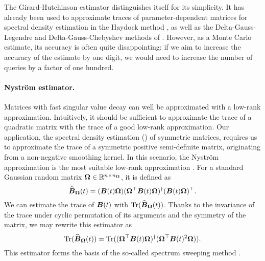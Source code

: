 The Girard-Hutchinson estimator distinguishes itself for its simplicity. It has already been used to approximate traces of parameter-dependent matrices for spectral density estimation in the Haydock method \cite{haydock-1972-electronic-structure}, as well as the Delta-Gauss-Legendre and Delta-Gauss-Chebyshev methods of \cite{lin-2016-approximating-spectral, lin-2017-randomized-estimation}. However, as a Monte Carlo estimate, its accuracy is often quite disappointing: if we aim to increase the accuracy of the estimate by one digit, we would need to increase the number of queries by a factor of one hundred.

\paragraph{Nyström estimator.} Matrices with fast singular value decay can well be approximated with a low-rank approximation. Intuitively, it should be sufficient to approximate the trace of a quadratic matrix with the trace of a good low-rank approximation. Our application, the spectral density estimation () of symmetric matrices, requires us to approximate the trace of a symmetric positive semi-definite matrix, originating from a non-negative smoothing kernel. In this scenario, the Nyström approximation is the most suitable low-rank approximation \cite{gittens-2013-revisiting-nystrom}. For a standard Gaussian random matrix $\boldsymbol{\Omega} \in \mathbb{R}^{n \times n_{\boldsymbol{\Omega}}}$, it is defined as
\begin{equation}
    \widehat{\boldsymbol{B}}_{\boldsymbol{\Omega}}(t) = (\boldsymbol{B}(t) \boldsymbol{\Omega}) (\boldsymbol{\Omega}^{\top} \boldsymbol{B}(t) \boldsymbol{\Omega})^{\dagger} (\boldsymbol{B}(t) \boldsymbol{\Omega})^{\top}.
    \label{equ:nystrom-approximation}
\end{equation}
We can estimate the trace of $\boldsymbol{B}(t)$ with $\operatorname{Tr}(\widehat{\boldsymbol{B}}_{\boldsymbol{\Omega}}(t))$. Thanks to the invariance of the trace under cyclic permutation of its arguments and the symmetry of the matrix, we may rewrite this estimator as
\begin{equation}
    \operatorname{Tr}(\widehat{\boldsymbol{B}}_{\boldsymbol{\Omega}}(t)) = \operatorname{Tr}( (\boldsymbol{\Omega}^{\top} \boldsymbol{B}(t) \boldsymbol{\Omega})^{\dagger} ( \boldsymbol{\Omega}^{\top} \boldsymbol{B}(t)^2 \boldsymbol{\Omega})).
    \label{equ:nystrom-trace-estimator}
\end{equation}
This estimator forms the basis of the so-called spectrum sweeping method \cite{lin-2017-randomized-estimation}. 

